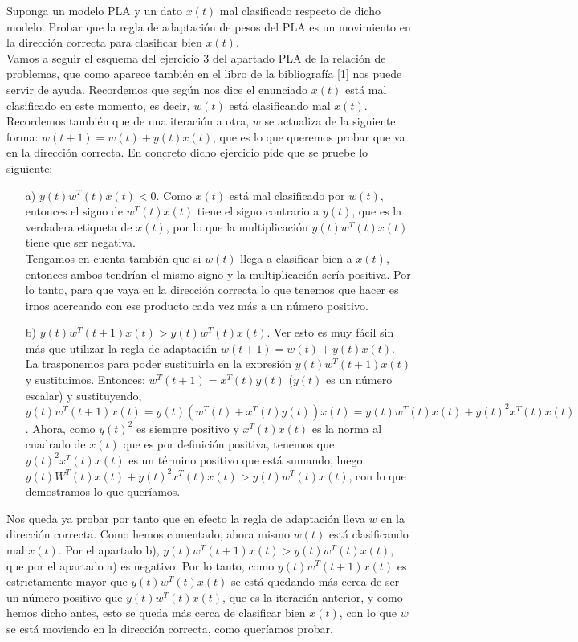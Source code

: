 \documentclass[12pt]{article}
\theoremstyle{definition}
\begin{document}
\begin{pregunta}
Suponga un modelo PLA y un dato $x(t)$ mal clasificado respecto de dicho modelo. Probar que la regla de adaptación de pesos del PLA es un movimiento en la dirección correcta para clasificar bien $x(t)$.\\

Vamos a seguir el esquema del ejercicio 3 del apartado PLA de la relación de problemas, que como aparece también en el libro de la bibliografía [1] nos puede servir de ayuda. Recordemos que según nos dice el enunciado $x(t)$ está mal clasificado en este momento, es decir, $w(t)$ está clasificando mal $x(t)$. Recordemos también que de una iteración a otra, $w$ se actualiza de la siguiente forma: $w(t+1) = w(t)+y(t)x(t)$, que es lo que queremos probar que va en la dirección correcta. En concreto dicho ejercicio pide que se pruebe lo siguiente:
\begin{enumerate}
\item[a)] $y(t)w^T(t)x(t) < 0$. Como $x(t)$ está mal clasificado por $w(t)$, entonces el signo de $w^T(t)x(t)$ tiene el signo contrario a $y(t)$, que es la verdadera etiqueta de $x(t)$, por lo que la multiplicación $y(t)w^T(t)x(t)$ tiene que ser negativa.\\ 
Tengamos en cuenta también que si $w(t)$ llega a clasificar bien a $x(t)$, entonces ambos tendrían el mismo signo y la multiplicación sería positiva. Por lo tanto, para que vaya en la dirección correcta lo que tenemos que hacer es irnos acercando con ese producto cada vez más a un número positivo.
\item[b)] $y(t)w^T(t+1)x(t)>y(t)w^T(t)x(t)$. Ver esto es muy fácil sin más que utilizar la regla de adaptación $w(t+1) = w(t)+y(t)x(t)$. La trasponemos para poder sustituirla en la expresión $y(t)w^T(t+1)x(t)$ y sustituimos. Entonces: $w^T(t+1) = x^T(t)y(t)$ ($y(t)$ es un número escalar) y sustituyendo, $y(t)w^T(t+1)x(t) = y(t)(w^T(t)+x^T(t)y(t))x(t) = y(t)w^T(t)x(t) + y(t)^2x^T(t)x(t)$. Ahora, como $y(t)^2$ es siempre positivo y $x^T(t)x(t)$ es la norma al cuadrado de $x(t)$ que es por definición positiva, tenemos que $y(t)^2x^T(t)x(t)$ es un término positivo que está sumando, luego $y(t)W^T(t)x(t) + y(t)^2x^T(t)x(t) > y(t)w^T(t)x(t)$, con lo que demostramos lo que queríamos.
\end{enumerate}
Nos queda ya probar por tanto que en efecto la regla de adaptación lleva $w$ en la dirección correcta. Como hemos comentado, ahora mismo $w(t)$ está clasificando mal $x(t)$. Por el apartado b), $y(t)w^T(t+1)x(t) > y(t)w^T(t)x(t)$, que por el apartado a) es negativo. Por lo tanto, como  $y(t)w^T(t+1)x(t)$ es estrictamente mayor que $y(t)w^T(t)x(t)$ se está quedando más cerca de ser un número positivo que $y(t)w^T(t)x(t)$, que es la iteración anterior, y como hemos dicho antes, esto se queda más cerca de clasificar bien $x(t)$, con lo que $w$ se está moviendo en la dirección correcta, como queríamos probar.
\end{pregunta}
\end{document}

